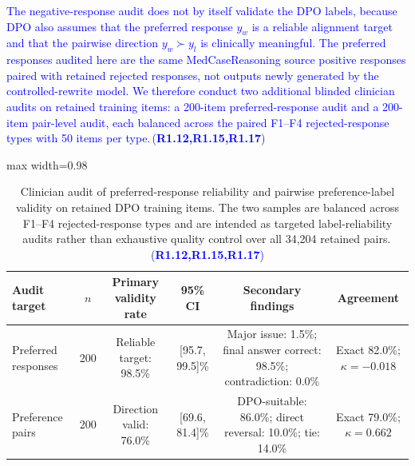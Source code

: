 \documentclass[a4paper,fleqn,doubleblind]{cas-sc}
\DeclareRobustCommand{\added}[1]{\textcolor{blue}{#1}}
\DeclareRobustCommand{\revtag}[1]{\textcolor{blue}{\scriptsize\,(\textbf{#1})}}
\begin{document}
\added{The negative-response audit does not by itself validate the DPO labels, because DPO also assumes that the preferred response $y_w$ is a reliable alignment target and that the pairwise direction $y_w \succ y_l$ is clinically meaningful. The preferred responses audited here are the same MedCaseReasoning source positive responses paired with retained rejected responses, not outputs newly generated by the controlled-rewrite model. We therefore conduct two additional blinded clinician audits on retained training items: a 200-item preferred-response audit and a 200-item pair-level audit, each balanced across the paired F1--F4 rejected-response types with 50 items per type.}\revtag{R1.12,R1.15,R1.17}

\begin{table}[htbp]
    \centering
    \begingroup\color{blue}
    \footnotesize
    \caption{Clinician audit of preferred-response reliability and pairwise preference-label validity on retained DPO training items. The two samples are balanced across F1--F4 rejected-response types and are intended as targeted label-reliability audits rather than exhaustive quality control over all 34,204 retained pairs.\revtag{R1.12,R1.15,R1.17}}
    \label{tab:preference_label_audit}
    \begin{adjustbox}{max width=0.98\textwidth}
    \begin{tabular}{lccccc}
        \toprule
        \textbf{Audit target} & \textbf{$n$} & \textbf{Primary validity rate} & \textbf{95\% CI} & \textbf{Secondary findings} & \textbf{Agreement} \\
        \midrule
        Preferred responses & 200 & Reliable target: 98.5\% & [95.7, 99.5]\% & Major issue: 1.5\%; final answer correct: 98.5\%; contradiction: 0.0\% & Exact 82.0\%; $\kappa=-0.018$ \\
        Preference pairs & 200 & Direction valid: 76.0\% & [69.6, 81.4]\% & DPO-suitable: 86.0\%; direct reversal: 10.0\%; tie: 14.0\% & Exact 79.0\%; $\kappa=0.662$ \\
        \bottomrule
    \end{tabular}
    \end{adjustbox}
    \endgroup
\end{table}
\end{document}
